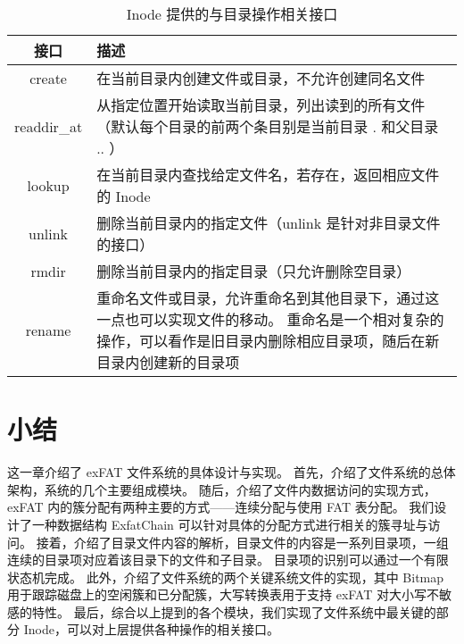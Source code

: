\begin{table}[h]
    \centering
    \begin{tabularx}{\textwidth}{|c|Y|}
    \hline
    接口 & 描述 \\
    \hline
    create & 在当前目录内创建文件或目录，不允许创建同名文件\\
    \hline
    readdir\_at & 从指定位置开始读取当前目录，列出读到的所有文件
    （默认每个目录的前两个条目别是当前目录 . 和父目录 .. ）\\
    \hline
    lookup & 在当前目录内查找给定文件名，若存在，返回相应文件的 Inode\\
    \hline
    unlink & 删除当前目录内的指定文件（unlink 是针对非目录文件的接口）\\
    \hline
    rmdir & 删除当前目录内的指定目录（只允许删除空目录）\\
    \hline
    rename & 重命名文件或目录，允许重命名到其他目录下，通过这一点也可以实现文件的移动。
    重命名是一个相对复杂的操作，可以看作是旧目录内删除相应目录项，随后在新目录内创建新的目录项\\
    \hline
    \end{tabularx}
    \caption{Inode 提供的与目录操作相关接口}
    \label{tab:dir}
\end{table}

\section{小结}
这一章介绍了 exFAT 文件系统的具体设计与实现。
首先，介绍了文件系统的总体架构，系统的几个主要组成模块。
随后，介绍了文件内数据访问的实现方式，exFAT 内的簇分配有两种主要的方式——连续分配与使用 FAT 表分配。
我们设计了一种数据结构 ExfatChain 可以针对具体的分配方式进行相关的簇寻址与访问。
接着，介绍了目录文件内容的解析，目录文件的内容是一系列目录项，一组连续的目录项对应着该目录下的文件和子目录。
目录项的识别可以通过一个有限状态机完成。
此外，介绍了文件系统的两个关键系统文件的实现，其中 Bitmap 用于跟踪磁盘上的空闲簇和已分配簇，大写转换表用于支持 exFAT 对大小写不敏感的特性。
最后，综合以上提到的各个模块，我们实现了文件系统中最关键的部分 Inode，可以对上层提供各种操作的相关接口。

